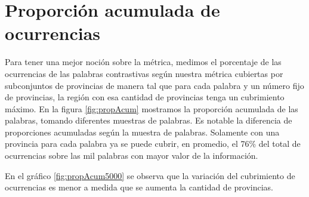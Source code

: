 \section{Proporción acumulada de ocurrencias} %
\label{proporcionDeOcurrencias}

Para tener una mejor noción sobre la métrica, medimos el porcentaje de las ocurrencias de las palabras contrastivas según nuestra métrica cubiertas por subconjuntos de provincias de manera tal que para cada palabra y un número fijo de provincias, la región con esa cantidad de provincias tenga un cubrimiento máximo. 
En la figura \ref{fig:propAcum} mostramos la proporción acumulada de las palabras, tomando diferentes muestras de palabras. Es notable la diferencia de proporciones acumuladas según la muestra de palabras. Solamente con una provincia para cada palabra ya se puede cubrir, en promedio, el 76\% del total de ocurrencias sobre las mil palabras con mayor valor de la información.

En el gráfico \ref{fig:propAcum5000} se observa que la variación del cubrimiento de ocurrencias es menor a medida que se aumenta la cantidad de provincias. 



